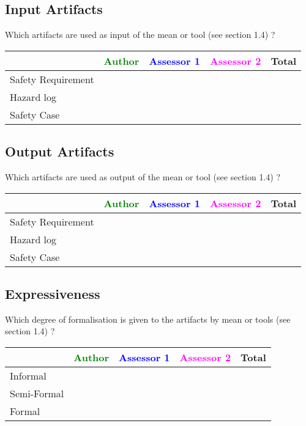 \subsection{Input Artifacts}

Which artifacts are used as input of the mean or tool (see \citep{D4.2.a} section 1.4) ? 


\begin{tabular}{|l | c | c | c | c|}
\hline
& \textcolor{green}{Author} & \textcolor{blue}{Assessor 1} & \textcolor{magenta}{Assessor 2} & Total \\
\hline 
Safety Requirement & & & &  \\
\hline
Hazard log & & & & \\
\hline
Safety Case & & & & \\
\hline
\end{tabular}



\subsection{Output Artifacts}

Which artifacts are used as output of the mean or tool (see \citep{D4.2.a} section 1.4) ? 


\begin{tabular}{|l | c | c | c | c|}
\hline
& \textcolor{green}{Author} & \textcolor{blue}{Assessor 1} & \textcolor{magenta}{Assessor 2} & Total \\
\hline 
Safety Requirement & & & &  \\
\hline
Hazard log & & & & \\
\hline
Safety Case & & & & \\
\hline
\end{tabular}

\subsection{Expressiveness}


Which degree of formalisation is given to the artifacts by mean or tools (see \citep{D4.2.a} section 1.4) ? 


\begin{tabular}{|l | c | c | c | c|}
\hline
& \textcolor{green}{Author} & \textcolor{blue}{Assessor 1} & \textcolor{magenta}{Assessor 2} & Total \\
\hline 
Informal & & & &  \\
\hline
Semi-Formal & & & & \\
\hline
Formal & & & & \\
\hline
\end{tabular}


